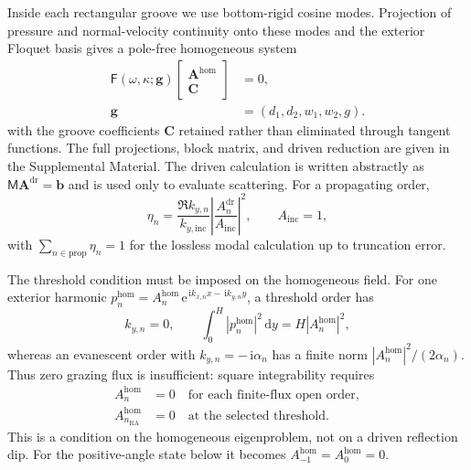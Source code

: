 \documentclass[aps,prl,reprint,superscriptaddress,nofootinbib]{revtex4-2}
\newcommand{\dd}{\,\mathrm{d}}
\newcommand{\ii}{\,\mathrm{i}}
\newcommand{\e}{\,\mathrm{e}}
\newcommand{\vect}[1]{\bm{#1}}
\newcommand{\RA}{\mathrm{RA}}
\providecommand{\dr}{\mathrm{dr}}
\providecommand{\hom}{\mathrm{hom}}
\providecommand{\inc}{\mathrm{inc}}
\begin{document}
Inside each rectangular groove we use bottom-rigid cosine modes.  Projection of pressure and normal-velocity continuity onto these modes and the exterior Floquet basis gives a pole-free homogeneous system
\begin{equation}
\begin{aligned}
 \mathsf F(\omega,\kappa;\boldsymbol g)
 \begin{bmatrix}\vect A^{\hom}\\ \vect C\end{bmatrix}&=0,\\
 \boldsymbol g&=(d_1,d_2,w_1,w_2,g).
\end{aligned}
\label{eq:homogeneous-system}
\end{equation}
with the groove coefficients $\vect C$ retained rather than eliminated through tangent functions.  The full projections, block matrix, and driven reduction are given in the Supplemental Material.  The driven calculation is written abstractly as $\mathsf M\vect A^{\dr}=\vect b$ and is used only to evaluate scattering.  For a propagating order,
\begin{equation}
 \eta_n=\frac{\Re k_{y,n}}{k_{y,\inc}}
 \left|\frac{A_n^{\dr}}{A_{\inc}}\right|^2,
 \qquad A_{\inc}=1,
 \label{eq:efficiency}
\end{equation}
with $\sum_{n\in\mathrm{prop}}\eta_n=1$ for the lossless modal calculation up to truncation error.

The threshold condition must be imposed on the homogeneous field.  For one exterior harmonic $p_n^{\hom}=A_n^{\hom}\e^{\ii k_{x,n}x-\ii k_{y,n}y}$, a threshold order has
\begin{equation}
 k_{y,n}=0,\qquad \int_0^H|p_n^{\hom}|^2\dd y=H|A_n^{\hom}|^2,
 \label{eq:threshold-norm}
\end{equation}
whereas an evanescent order with $k_{y,n}=-\ii\alpha_n$ has a finite norm $|A_n^{\hom}|^2/(2\alpha_n)$.  Thus zero grazing flux is insufficient: square integrability requires
\begin{equation}
\begin{aligned}
 A_n^{\hom}&=0\quad\text{for each finite-flux open order},\\
 A_{n_{\RA}}^{\hom}&=0\quad\text{at the selected threshold}.
\end{aligned}
\label{eq:strict-zero}
\end{equation}
This is a condition on the homogeneous eigenproblem, not on a driven reflection dip.  For the positive-angle state below it becomes $A_{-1}^{\hom}=A_0^{\hom}=0$.
\end{document}
